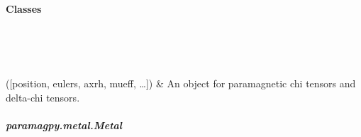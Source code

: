 \documentclass[a4paper,10pt,english]{sphinxmanual}
\begin{document}
\paragraph{Classes}
\label{\detokenize{reference/metal:classes}}

\begin{savenotes}\sphinxatlongtablestart\begin{longtable}{}
\hline

\endfirsthead

%
{}\\
\hline

\endhead

\hline
{}\\
\endfoot

\endlastfoot

{\hyperref[\detokenize{reference/generated/paramagpy.metal.Metal:paramagpy.metal.Metal}]{}}({[}position, eulers, axrh, mueff, …{]})
&
An object for paramagnetic chi tensors and delta-chi tensors.
\\
\hline
\end{longtable}\sphinxatlongtableend\end{savenotes}


\subparagraph{paramagpy.metal.Metal}
\label{\detokenize{reference/generated/paramagpy.metal.Metal:paramagpy-metal-metal}}\label{\detokenize{reference/generated/paramagpy.metal.Metal::doc}}
\end{document}
